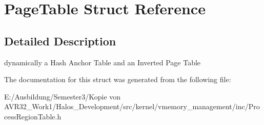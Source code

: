 \hypertarget{struct_page_table}{
\section{PageTable Struct Reference}
\label{struct_page_table}
}


\subsection{Detailed Description}
dynamically a Hash Anchor Table and an Inverted Page Table 

The documentation for this struct was generated from the following file:\begin{CompactItemize}
\item 
E:/Ausbildung/Semester3/Kopie von AVR32\_\-Work1/Halos\_\-Development/src/kernel/vmemory\_\-management/inc/ProcessRegionTable.h\end{CompactItemize}
